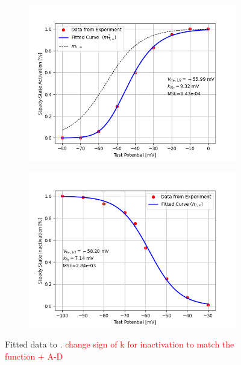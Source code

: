 \documentclass[../main.tex]{subfiles}
\begin{document}
\FloatBarrier


\begin{figure}[!t]
    \centering
    \begin{subfigure}[t]{0.45\textwidth}
        \centering
        \includegraphics[width=\textwidth]{../../reports/workflow/img/t_type_calcium_channel/3_fitted_steady_state_activation.png}
    \end{subfigure}
    \hfill
    \begin{subfigure}[t]{0.45\textwidth}
        \centering
        \includegraphics[width=\textwidth]{../../reports/workflow/img/t_type_calcium_channel/5_fitted_steady_state_inactivation.png}
    \end{subfigure}
    
    \caption{Fitted data to \parencite{jeongCaa1TFlyTtype2015}. \textcolor{red}{change sign of k for inactivation to match the function + A-D}}
    \label{fig:data_steady_state_from_jeong}
\end{figure}
\end{document}
